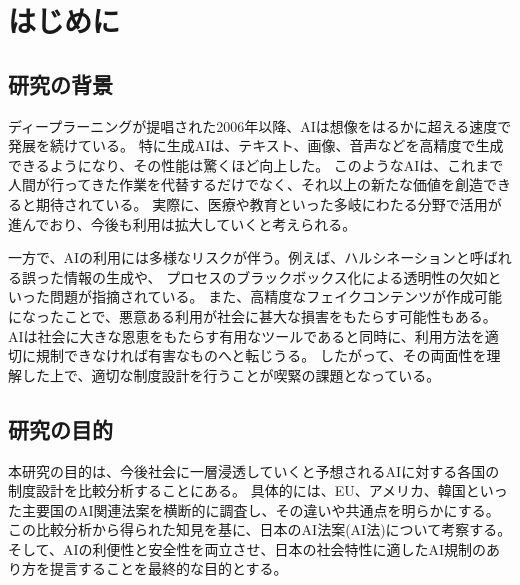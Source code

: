 \chapter{はじめに}

\section{研究の背景}
ディープラーニングが提唱された2006年以降、AIは想像をはるかに超える速度で発展を続けている。
特に生成AIは、テキスト、画像、音声などを高精度で生成できるようになり、その性能は驚くほど向上した。
このようなAIは、これまで人間が行ってきた作業を代替するだけでなく、それ以上の新たな価値を創造できると期待されている。
実際に、医療や教育といった多岐にわたる分野で活用が進んでおり、今後も利用は拡大していくと考えられる。

一方で、AIの利用には多様なリスクが伴う。例えば、ハルシネーションと呼ばれる誤った情報の生成や、
プロセスのブラックボックス化による透明性の欠如といった問題が指摘されている。
また、高精度なフェイクコンテンツが作成可能になったことで、悪意ある利用が社会に甚大な損害をもたらす可能性もある。
AIは社会に大きな恩恵をもたらす有用なツールであると同時に、利用方法を適切に規制できなければ有害なものへと転じうる。
したがって、その両面性を理解した上で、適切な制度設計を行うことが喫緊の課題となっている。


\section{研究の目的}
本研究の目的は、今後社会に一層浸透していくと予想されるAIに対する各国の制度設計を比較分析することにある。
具体的には、EU、アメリカ、韓国といった主要国のAI関連法案を横断的に調査し、その違いや共通点を明らかにする。
この比較分析から得られた知見を基に、日本のAI法案(AI法)について考察する。
そして、AIの利便性と安全性を両立させ、日本の社会特性に適したAI規制のあり方を提言することを最終的な目的とする。


